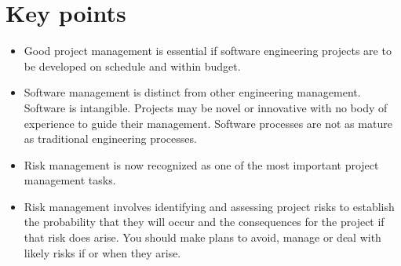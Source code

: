 \section{ Key points}
\begin{itemize}

\item Good project management is essential if software engineering projects are to be developed on schedule and within budget.

\item Software management is distinct from other engineering management. Software is intangible. Projects may be novel or innovative with no body of experience to guide their management. Software processes are not as mature as traditional engineering processes.

\item Risk management is now recognized as one of the most important project management tasks.

\item Risk management involves identifying and assessing project risks to establish the probability that they will occur and the consequences for the project if that risk does arise. You should make plans to avoid, manage or deal with likely risks if or when they arise.

\end{itemize}

\newpage
